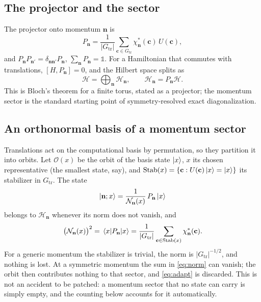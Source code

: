 \documentclass[12pt]{article}
\newcommand{\Hil}{\mathscr{H}}
\newcommand{\Gtr}{G_{\mathrm{tr}}}
\newcommand{\Stab}{\operatorname{Stab}}
\begin{document}
\subsection{The projector and the sector}

The projector onto momentum $\mathbf{n}$ is
\begin{equation}
  P_{\mathbf{n}} = \frac{1}{|\Gtr|}\sum_{\mathbf{c} \in \Gtr}
  \chi_{\mathbf{n}}^{*}(\mathbf{c})\, U(\mathbf{c}),
  \label{eq:Pn}
\end{equation}
and $P_{\mathbf{n}}P_{\mathbf{n}'} = \delta_{\mathbf{n}\mathbf{n}'}P_{\mathbf{n}}$,
$\sum_{\mathbf{n}}P_{\mathbf{n}} = \mathbb{1}$. For a Hamiltonian that commutes
with translations, $[H,P_{\mathbf{n}}] = 0$, and the Hilbert space splits as
\begin{equation}
  \Hil = \bigoplus_{\mathbf{n}} \Hil_{\mathbf{n}}, \qquad
  \Hil_{\mathbf{n}} = P_{\mathbf{n}}\Hil .
\end{equation}
This is Bloch's theorem for a finite torus, stated as a projector; the
momentum sector is the standard starting point of symmetry-resolved exact
diagonalization\cite{sandvik2010}.

\subsection{An orthonormal basis of a momentum sector}

Translations act on the computational basis by permutation, so they partition it
into orbits. Let $\mathcal{O}(x)$ be the orbit of the basis state $\ket{x}$,
$x$ its chosen representative (the smallest state, say), and
$\Stab(x) = \{\mathbf{c} : U(\mathbf{c})\ket{x} = \ket{x}\}$ its stabilizer in
$G_{\mathrm{tr}}$. The state
\begin{equation}
  \ket{\mathbf{n};x} = \frac{1}{\mathcal{N}_{\mathbf{n}}(x)}\,P_{\mathbf{n}}\ket{x}
  \label{eq:adapt}
\end{equation}
belongs to $\Hil_{\mathbf{n}}$ whenever its norm does not vanish, and
\begin{equation}
  \bigl(\mathcal{N}_{\mathbf{n}}(x)\bigr)^2 = \mel{x}{P_{\mathbf{n}}}{x}
  = \frac{1}{|\Gtr|}\sum_{\mathbf{c}\in\Stab(x)}
  \chi_{\mathbf{n}}^{*}(\mathbf{c}).
  \label{eq:norm}
\end{equation}
For a generic momentum the stabilizer is trivial, the norm is
$|\Gtr|^{-1/2}$, and nothing is lost. At a symmetric momentum the sum in
\eqref{eq:norm} can vanish; the orbit then contributes nothing to that sector,
and \eqref{eq:adapt} is discarded. This is not an accident to be patched: a
momentum sector that no state can carry is simply empty, and the counting below
accounts for it automatically.
\end{document}
